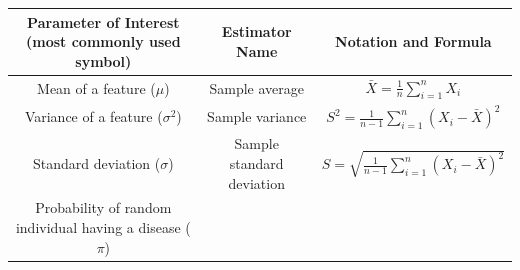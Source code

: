 \documentclass[]{book}
\theoremstyle{definition}
\theoremstyle{definition}
\theoremstyle{definition}
\theoremstyle{remark}
\begin{document}
\begin{longtable}[]{@{}ccc@{}}
\toprule
\begin{minipage}[b]{0.35\columnwidth}\centering
Parameter of Interest (most commonly used symbol)\strut
\end{minipage} & \begin{minipage}[b]{0.21\columnwidth}\centering
Estimator Name\strut
\end{minipage} & \begin{minipage}[b]{0.35\columnwidth}\centering
Notation and Formula\strut
\end{minipage}\tabularnewline
\midrule
\endhead
\begin{minipage}[t]{0.35\columnwidth}\centering
Mean of a feature (\(\mu\))\strut
\end{minipage} & \begin{minipage}[t]{0.21\columnwidth}\centering
Sample average\strut
\end{minipage} & \begin{minipage}[t]{0.35\columnwidth}\centering
\(\bar{X} = \frac{1}{n} \sum_{i=1}^n X_i\)\strut
\end{minipage}\tabularnewline
\begin{minipage}[t]{0.35\columnwidth}\centering
Variance of a feature (\(\sigma^2\))\strut
\end{minipage} & \begin{minipage}[t]{0.21\columnwidth}\centering
Sample variance\strut
\end{minipage} & \begin{minipage}[t]{0.35\columnwidth}\centering
\(S^2 = \frac{1}{n-1} \sum_{i=1}^n (X_i - \bar{X})^2\)\strut
\end{minipage}\tabularnewline
\begin{minipage}[t]{0.35\columnwidth}\centering
Standard deviation (\(\sigma\))\strut
\end{minipage} & \begin{minipage}[t]{0.21\columnwidth}\centering
Sample standard deviation\strut
\end{minipage} & \begin{minipage}[t]{0.35\columnwidth}\centering
\(S = \sqrt{\frac{1}{n-1} \sum_{i=1}^n (X_i - \bar{X})^2}\)\strut
\end{minipage}\tabularnewline
\begin{minipage}[t]{0.35\columnwidth}\centering
Probability of random individual having a disease (\(\pi\))\strut
\end{minipage} & \begin{minipage}[t]{0.21\columnwidth}\centering

\end{minipage}
\end{longtable}
\end{document}
